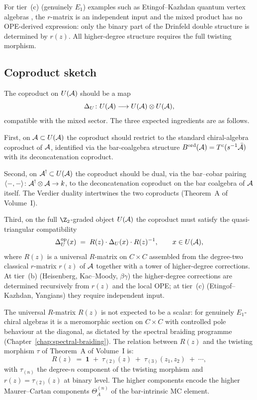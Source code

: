 For tier~(c) (genuinely $E_1$) examples such as
Etingof--Kazhdan quantum vertex algebras
\cite{etingof1996quantization}, the $r$-matrix is an
independent input and the mixed product has no OPE-derived
expression: only the binary part of the Drinfeld double
structure is determined by $r(z)$. All higher-degree
structure requires the full twisting morphism.

\subsection{Coproduct sketch}
\label{subsec:drinfeld-e1-coproduct}

The coproduct on $U(\mathcal{A})$ should be a map
\[
\Delta_U \colon U(\mathcal{A}) \longrightarrow U(\mathcal{A}) \otimes U(\mathcal{A}),
\]
compatible with the mixed sector. The three expected ingredients
are as follows.

First, on $\mathcal{A}\subset U(\mathcal{A})$ the coproduct should
restrict to the standard chiral-algebra coproduct of
$\mathcal{A}$, identified via the bar-coalgebra structure
$B^{\mathrm{ord}}(\mathcal{A}) = T^c(s^{-1}\bar{\mathcal{A}})$ with its
deconcatenation coproduct.

Second, on $\mathcal{A}^!\subset U(\mathcal{A})$ the coproduct should be
dual, via the bar--cobar pairing
$\langle-,-\rangle\colon\mathcal{A}^!\otimes\mathcal{A}\to k$, to the
deconcatenation coproduct on the bar coalgebra of $\mathcal{A}$
itself. The Verdier duality intertwines the two
coproducts (Theorem~A of Volume~I).

Third, on the full $\Z_2$-graded object $U(\mathcal{A})$ the
coproduct must satisfy the quasi-triangular compatibility
\begin{equation}
\label{eq:drinfeld-e1-qt-compat}
\Delta_U^{\mathrm{op}}(x)
\;=\;R(z)\cdot \Delta_U(x)\cdot R(z)^{-1},
\qquad x\in U(\mathcal{A}),
\end{equation}
where $R(z)$ is a universal $R$-matrix on $C\times C$
assembled from the degree-two classical $r$-matrix $r(z)$
of $\mathcal{A}$ together with a tower of higher-degree corrections.
At tier~(b) (Heisenberg, Kac--Moody, $\beta\gamma$) the
higher-degree corrections are determined recursively from
$r(z)$ and the local OPE; at tier~(c) (Etingof--Kazhdan,
Yangians) they require independent input.

The universal $R$-matrix $R(z)$ is not expected to be a
scalar: for genuinely $E_1$-chiral algebras it is a
meromorphic section on $C\times C$ with controlled pole
behaviour at the diagonal, as dictated by the spectral
braiding programme
(Chapter~\ref{chap:spectral-braiding}). The relation
between $R(z)$ and the twisting morphism $\tau$ of
Theorem~A of Volume~I is:
\begin{equation}
\label{eq:drinfeld-e1-R-tau}
R(z)
\;=\;\mathbf{1}
\;+\;\tau_{(2)}(z)
\;+\;\tau_{(3)}(z_1,z_2)
\;+\;\cdots,
\end{equation}
with $\tau_{(n)}$ the degree-$n$ component of the
twisting morphism and $r(z) = \tau_{(2)}(z)$ at binary
level. The higher components encode the
higher Maurer--Cartan components $\Theta_A^{(n)}$ of the
bar-intrinsic MC element.

